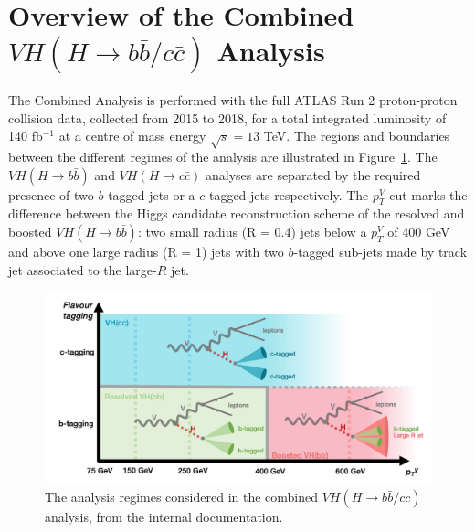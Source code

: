 \section{Overview of the Combined $VH (H\rightarrow b\bar{b}/c\bar{c})$ Analysis}
The Combined Analysis is performed with the full ATLAS Run 2 proton-proton collision data, collected from 2015 to 2018, for a total integrated luminosity of 140 fb$^{-1}$ at a centre of mass energy $\sqrt{s} = 13$ TeV. The regions and boundaries between the different regimes of the analysis are illustrated in Figure~\ref{fig:ana-strat}. The $VH (H\rightarrow b\bar{b})$ and $VH (H\rightarrow c\bar{c})$ analyses are separated by the required presence of two $b$-tagged jets or a $c$-tagged jets respectively. The $p_T^V$ cut marks the difference between the Higgs candidate reconstruction scheme of the resolved and boosted $VH (H\rightarrow b\bar{b})$: two small radius (R = 0.4) jets below a $p_T^V$ of 400 GeV and above one large radius (R = 1) jets with two $b$-tagged sub-jets made by  track jet associated to the large-$R$ jet.

\begin{figure}[h!]
\center
\includegraphics[width=\textwidth]{Images/VH/Cat/AnalysisRegime.png}
\caption{The analysis regimes considered in the combined $VH (H\rightarrow b\bar{b}/c\bar{c})$ analysis, from the internal documentation.} 
\label{fig:ana-strat}
\end{figure}

